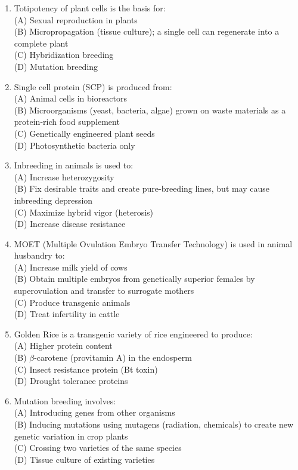 \documentclass{article}
\begin{document}
\begin{enumerate}[label=Q\arabic*.]
\item Totipotency of plant cells is the basis for:
\\(A) Sexual reproduction in plants
\\(B) Micropropagation (tissue culture); a single cell can regenerate into a complete plant
\\(C) Hybridization breeding
\\(D) Mutation breeding

\item Single cell protein (SCP) is produced from:
\\(A) Animal cells in bioreactors
\\(B) Microorganisms (yeast, bacteria, algae) grown on waste materials as a protein-rich food supplement
\\(C) Genetically engineered plant seeds
\\(D) Photosynthetic bacteria only

\item Inbreeding in animals is used to:
\\(A) Increase heterozygosity
\\(B) Fix desirable traits and create pure-breeding lines, but may cause inbreeding depression
\\(C) Maximize hybrid vigor (heterosis)
\\(D) Increase disease resistance

\item MOET (Multiple Ovulation Embryo Transfer Technology) is used in animal husbandry to:
\\(A) Increase milk yield of cows
\\(B) Obtain multiple embryos from genetically superior females by superovulation and transfer to surrogate mothers
\\(C) Produce transgenic animals
\\(D) Treat infertility in cattle

\item Golden Rice is a transgenic variety of rice engineered to produce:
\\(A) Higher protein content
\\(B) $\beta$-carotene (provitamin A) in the endosperm
\\(C) Insect resistance protein (Bt toxin)
\\(D) Drought tolerance proteins

\item Mutation breeding involves:
\\(A) Introducing genes from other organisms
\\(B) Inducing mutations using mutagens (radiation, chemicals) to create new genetic variation in crop plants
\\(C) Crossing two varieties of the same species
\\(D) Tissue culture of existing varieties


\end{enumerate}
\end{document}
